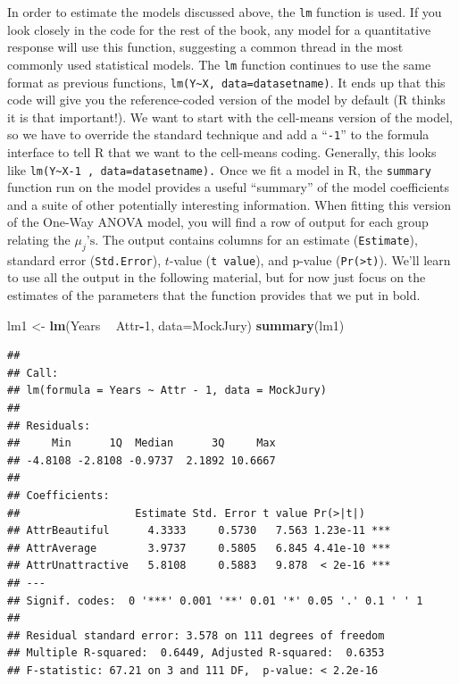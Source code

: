 \documentclass[]{book}
\newenvironment{Shaded}{\begin{snugshade}}{\end{snugshade}}
\newcommand{\KeywordTok}[1]{\textcolor[rgb]{0.13,0.29,0.53}{\textbf{#1}}}
\newcommand{\DataTypeTok}[1]{\textcolor[rgb]{0.13,0.29,0.53}{#1}}
\newcommand{\DecValTok}[1]{\textcolor[rgb]{0.00,0.00,0.81}{#1}}
\newcommand{\StringTok}[1]{\textcolor[rgb]{0.31,0.60,0.02}{#1}}
\newcommand{\OperatorTok}[1]{\textcolor[rgb]{0.81,0.36,0.00}{\textbf{#1}}}
\newcommand{\NormalTok}[1]{#1}
\begin{document}
In order to estimate the models discussed above, the \texttt{lm}
function is used. If you look closely in the code for the rest of the
book, any model for a quantitative response will use this function,
suggesting a common thread in the most commonly used statistical models.
The \texttt{lm} function continues to use the same format as previous
functions, \texttt{lm(Y\textasciitilde{}X,\ data=datasetname)}. It ends
up that this code will give you the reference-coded version of the model
by default (R thinks it is that important!). We want to start with the
cell-means version of the model, so we have to override the standard
technique and add a ``\texttt{-1}'' to the formula interface to tell R
that we want to the cell-means coding. Generally, this looks like
\texttt{lm(Y\textasciitilde{}X-1\ ,\ data=datasetname).} Once we fit a
model in R, the \texttt{summary} function run on the model provides a
useful ``summary'' of the model coefficients and a suite of other
potentially interesting information. When fitting this version of the
One-Way ANOVA model, you will find a row of output for each group
relating the \(\mu_j\text{'s}\). The output contains columns for an
estimate (\texttt{Estimate}), standard error (\texttt{Std.Error}),
\(t\)-value (\texttt{t\ value}), and p-value
(\texttt{Pr(\textgreater{}\textbar{}t\textbar{})}). We'll learn to use
all the output in the following material, but for now just focus on the
estimates of the parameters that the function provides that we put in
bold.

\begin{Shaded}
\begin{Highlighting}[]
\NormalTok{lm1 <-}\StringTok{ }\KeywordTok{lm}\NormalTok{(Years }\OperatorTok{~}\StringTok{ }\NormalTok{Attr}\OperatorTok{-}\DecValTok{1}\NormalTok{, }\DataTypeTok{data=}\NormalTok{MockJury)}
\KeywordTok{summary}\NormalTok{(lm1)}
\end{Highlighting}
\end{Shaded}

\begin{verbatim}
## 
## Call:
## lm(formula = Years ~ Attr - 1, data = MockJury)
## 
## Residuals:
##     Min      1Q  Median      3Q     Max 
## -4.8108 -2.8108 -0.9737  2.1892 10.6667 
## 
## Coefficients:
##                  Estimate Std. Error t value Pr(>|t|)    
## AttrBeautiful      4.3333     0.5730   7.563 1.23e-11 ***
## AttrAverage        3.9737     0.5805   6.845 4.41e-10 ***
## AttrUnattractive   5.8108     0.5883   9.878  < 2e-16 ***
## ---
## Signif. codes:  0 '***' 0.001 '**' 0.01 '*' 0.05 '.' 0.1 ' ' 1
## 
## Residual standard error: 3.578 on 111 degrees of freedom
## Multiple R-squared:  0.6449, Adjusted R-squared:  0.6353 
## F-statistic: 67.21 on 3 and 111 DF,  p-value: < 2.2e-16
\end{verbatim}
\end{document}
